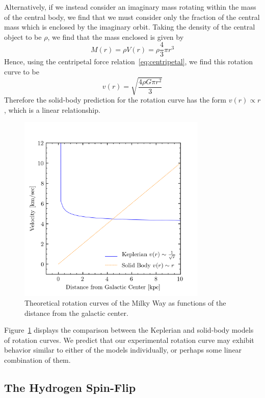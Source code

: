 \documentclass[aps,twocolumn,secnumarabic,balancelastpage,amsmath,amssymb,nofootinbib, floatfix]{revtex4-2}
\begin{document}
 	Alternatively, if we instead consider an imaginary mass rotating within the mass of the central body, we find that we must consider only the fraction of the central mass which is enclosed by the imaginary orbit. Taking the density of the central object to be $\rho$, we find that the mass enclosed is given by 
 	\begin{equation}
 		M(r)=\rho V(r)=\rho \frac{4}{3}\pi r^{3}
 	\end{equation}  
 	Hence, using the centripetal force relation~\ref{eq:centripetal}, we find this rotation curve to be
 	\begin{equation}
 		v(r)=\sqrt{\frac{4\rho G \pi r^{2}}{3}}
 		\label{eq:solidbody}
 	\end{equation}
 	Therefore the solid-body prediction for the rotation curve has the form $v(r)\propto r$, which is a linear relationship. 
	\begin{figure}
		\includegraphics[width=9cm]{theo_rot_curves.png}
		\caption{Theoretical rotation curves of the Milky Way as functions of the distance from the galactic center.}
		\label{fig:model}
	\end{figure}
	
	Figure~\ref{fig:model} displays the comparison between the Keplerian and solid-body models of rotation curves. We predict that our experimental rotation curve may exhibit behavior similar to either of the models individually, or perhaps some linear combination of them. 
	
	\subsection{The Hydrogen Spin-Flip}
	
\end{document}

